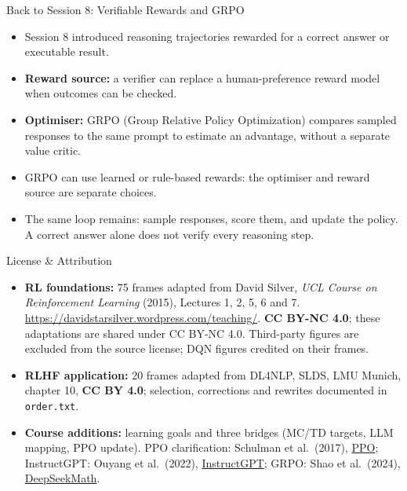 \begin{frame}{Back to Session 8: Verifiable Rewards and GRPO}
\begin{itemize}
\item Session 8 introduced reasoning trajectories rewarded for a correct answer or executable result.
\item \textbf{Reward source:} a verifier can replace a human-preference reward model when outcomes can be checked.
\item \textbf{Optimiser:} GRPO (Group Relative Policy Optimization) compares sampled responses to the same prompt to estimate an advantage, without a separate value critic.
\item GRPO can use learned or rule-based rewards: the optimiser and reward source are separate choices.
\item The same loop remains: sample responses, score them, and update the policy. A correct answer alone does not verify every reasoning step.
\end{itemize}
\href{https://arxiv.org/abs/2402.03300}{}
\end{frame}


\begin{frame}{License \& Attribution}
\footnotesize
\begin{itemize}
\item \textbf{RL foundations:} 75 frames adapted from David Silver, \emph{UCL Course on Reinforcement Learning} (2015), Lectures 1, 2, 5, 6 and 7. \url{https://davidstarsilver.wordpress.com/teaching/}. \textbf{CC BY-NC 4.0}; these adaptations are shared under CC BY-NC 4.0. Third-party figures are excluded from the source license; DQN figures credited on their frames.
\item \textbf{RLHF application:} 20 frames adapted from DL4NLP, SLDS, LMU Munich, chapter 10, \textbf{CC BY 4.0}; selection, corrections and rewrites documented in \texttt{order.txt}.
\item \textbf{Course additions:} learning goals and three bridges (MC/TD targets, LLM mapping, PPO update). PPO clarification: Schulman et al.\ (2017), \href{https://arxiv.org/abs/1707.06347}{PPO}; InstructGPT: Ouyang et al.\ (2022), \href{https://arxiv.org/abs/2203.02155}{InstructGPT}; GRPO: Shao et al.\ (2024), \href{https://arxiv.org/abs/2402.03300}{DeepSeekMath}.
\end{itemize}
\end{frame}

\endlecture

